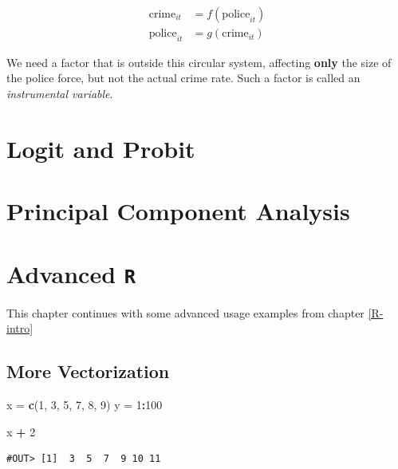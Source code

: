 \documentclass[]{book}
\newenvironment{Shaded}{\begin{snugshade}}{\end{snugshade}}
\newcommand{\KeywordTok}[1]{\textcolor[rgb]{0.13,0.29,0.53}{\textbf{#1}}}
\newcommand{\DecValTok}[1]{\textcolor[rgb]{0.00,0.00,0.81}{#1}}
\newcommand{\StringTok}[1]{\textcolor[rgb]{0.31,0.60,0.02}{#1}}
\newcommand{\OperatorTok}[1]{\textcolor[rgb]{0.81,0.36,0.00}{\textbf{#1}}}
\newcommand{\NormalTok}[1]{#1}
\theoremstyle{definition}
\theoremstyle{definition}
\theoremstyle{definition}
\theoremstyle{remark}
\begin{document}
\begin{align*}
\text{crime}_{it} &= f(\text{police}_{it}) \\
\text{police}_{it}&= g(\text{crime}_{it} )
\end{align*}

We need a factor that is outside this circular system, affecting
\textbf{only} the size of the police force, but not the actual crime
rate. Such a factor is called an \emph{instrumental variable}.

\chapter{Logit and Probit}\label{logit-probit}

\chapter{Principal Component Analysis}\label{pca}

\chapter{\texorpdfstring{Advanced
\texttt{R}}{Advanced R}}\label{R-advanced}

This chapter continues with some advanced usage examples from chapter
\ref{R-intro}

\section{More Vectorization}\label{more-vectorization}

\begin{Shaded}
\begin{Highlighting}[]
\NormalTok{x =}\StringTok{ }\KeywordTok{c}\NormalTok{(}\DecValTok{1}\NormalTok{, }\DecValTok{3}\NormalTok{, }\DecValTok{5}\NormalTok{, }\DecValTok{7}\NormalTok{, }\DecValTok{8}\NormalTok{, }\DecValTok{9}\NormalTok{)}
\NormalTok{y =}\StringTok{ }\DecValTok{1}\OperatorTok{:}\DecValTok{100}
\end{Highlighting}
\end{Shaded}

\begin{Shaded}
\begin{Highlighting}[]
\NormalTok{x }\OperatorTok{+}\StringTok{ }\DecValTok{2}
\end{Highlighting}
\end{Shaded}

\begin{verbatim}
#OUT> [1]  3  5  7  9 10 11
\end{verbatim}
\end{document}
